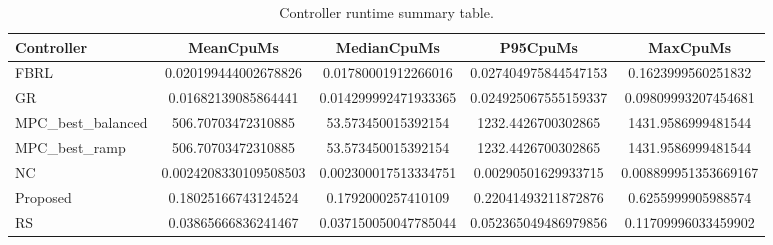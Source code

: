 \begin{table}[t]
\centering
\caption{Controller runtime summary table.}
\label{tab:runtime_auto}
\begin{tabular}{lcccc}
\toprule
Controller & MeanCpuMs & MedianCpuMs & P95CpuMs & MaxCpuMs \\
\midrule
FBRL & 0.020199444002678826 & 0.01780001912266016 & 0.027404975844547153 & 0.1623999560251832 \\
GR & 0.01682139085864441 & 0.014299992471933365 & 0.024925067555159337 & 0.09809993207454681 \\
MPC\_best\_balanced & 506.70703472310885 & 53.573450015392154 & 1232.4426700302865 & 1431.9586999481544 \\
MPC\_best\_ramp & 506.70703472310885 & 53.573450015392154 & 1232.4426700302865 & 1431.9586999481544 \\
NC & 0.0024208330109508503 & 0.002300017513334751 & 0.00290501629933715 & 0.008899951353669167 \\
Proposed & 0.18025166743124524 & 0.1792000257410109 & 0.22041493211872876 & 0.6255999905988574 \\
RS & 0.03865666836241467 & 0.037150050047785044 & 0.052365049486979856 & 0.11709996033459902 \\
\bottomrule
\end{tabular}
\end{table}